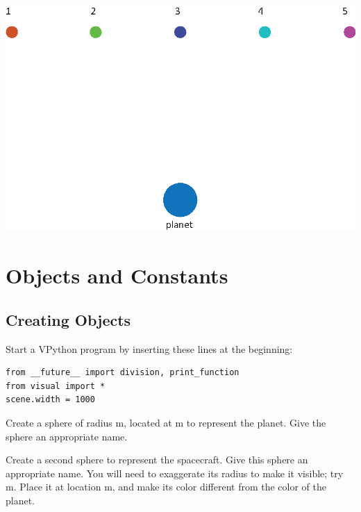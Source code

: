 \documentclass[10pt]{article}
\begin{document}
\begin{center}
\includegraphics{planet_5_spacecraft.eps}
\end{center}

\vspace*{10pt}
\checkpoint

\section{Objects and Constants}

\subsection{Creating Objects}

\begin{compactitem}[\color{MIRed}$\Rightarrow$]
\item Start a VPython program by inserting these lines at the beginning:\\
\color{CodeColor}
\begin{verbatim}
from __future__ import division, print_function
from visual import *
scene.width = 1000
\end{verbatim}
\color{black}
\vspace*{10pt}
\item Create a sphere of radius  m, located at  m to represent the planet. Give the sphere an appropriate name.
\item Create a second sphere to represent the spacecraft. Give this sphere an appropriate name. You will need to exaggerate its radius to make it visible; try  m.  Place it at location  m, and make its color different from the color of the planet.
\end{compactitem}
\end{document}
